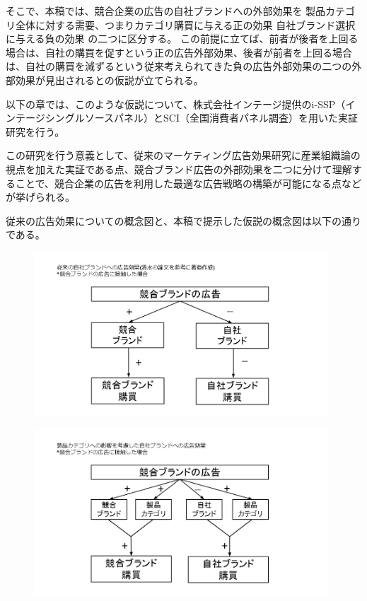 \documentclass[11pt]{jsarticle}
\begin{document}
そこで、本稿では、競合企業の広告の自社ブランドへの外部効果を
製品カテゴリ全体に対する需要、つまりカテゴリ購買に与える正の効果
自社ブランド選択に与える負の効果
の二つに区分する。
この前提に立てば、前者が後者を上回る場合は、自社の購買を促すという正の広告外部効果、後者が前者を上回る場合は、自社の購買を減ずるという従来考えられてきた負の広告外部効果の二つの外部効果が見出されるとの仮説が立てられる。

以下の章では、このような仮説について、株式会社インテージ提供のi-SSP（インテージシングルソースパネル）とSCI（全国消費者パネル調査）を用いた実証研究を行う。

この研究を行う意義として、従来のマーケティング広告効果研究に産業組織論の視点を加えた実証である点、競合ブランド広告の外部効果を二つに分けて理解することで、競合企業の広告を利用した最適な広告戦略の構築が可能になる点などが挙げられる。

従来の広告効果についての概念図と、本稿で提示した仮説の概念図は以下の通りである。

\begin{figure}[htbp]
 \centering
 \includegraphics[width=11cm]{./fig/2_ad_before.png}
 \label{fig:ad_before}
\end{figure}

\begin{figure}[htbp]
 \centering
 \includegraphics[width=11cm]{./fig/2_ad_after.png}
 \label{fig:ad_after}
\end{figure}
\end{document}
